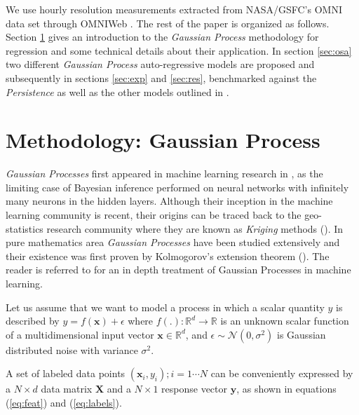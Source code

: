 \documentclass[referee,a4paper,12pt,traditabstract]{swsc}
\begin{document}
\begin{linenumbers}
We use hourly resolution measurements extracted from NASA/GSFC's OMNI data set through OMNIWeb \citep{OmniPaper}. The rest of the paper is organized as follows. Section \ref{sec:method} gives an introduction to the \emph{Gaussian Process} methodology for regression and some technical details about their application. In section \ref{sec:osa} two different \emph{Gaussian Process} auto-regressive models are proposed and subsequently in sections \ref{sec:exp} and \ref{sec:res}, benchmarked against the \emph{Persistence} as well as the other models outlined in \citet{Ji2012}.

  
\section{Methodology: Gaussian Process} \label{sec:method}

\emph{Gaussian Processes} first appeared in machine learning research in \citet{Neal:1996:BLN:525544}, as the limiting case of Bayesian inference performed on neural networks with infinitely many neurons in the hidden layers. Although their inception in the machine learning community is recent, their origins can be traced back to the geo-statistics research community where they are known as \emph{Kriging} methods (\citet{krige1951statistical}). In pure mathematics area \emph{Gaussian Processes} have been studied extensively and their existence was first proven by Kolmogorov's extension theorem (\citet{tao2011introduction}). The reader is referred to \cite{Rasmussen:2005:GPM:1162254} for an in depth treatment of Gaussian Processes in machine learning.

Let us assume that we want to model a process in which a scalar quantity $y$ is described by $y = f(\mathbf{x}) + \epsilon$ where   $f(.): \mathbb{R}^d \rightarrow \mathbb{R}$ is an unknown scalar function of a multidimensional input vector $\mathbf{x} \in \mathbb{R}^d$, and $\epsilon \sim \mathcal{N}(0, \sigma^2)$ is Gaussian distributed noise with variance $\sigma^2$.

A set of labeled data points ${(\mathbf{x}_i, y_i); i = 1 \cdots N}$ can be conveniently expressed by a $N \times d$ data matrix $\mathbf{X}$ and a $N \times 1$ response vector $\mathbf{y}$, as shown in equations (\ref{eq:feat}) and (\ref{eq:labels}).


\end{linenumbers}
\end{document}
